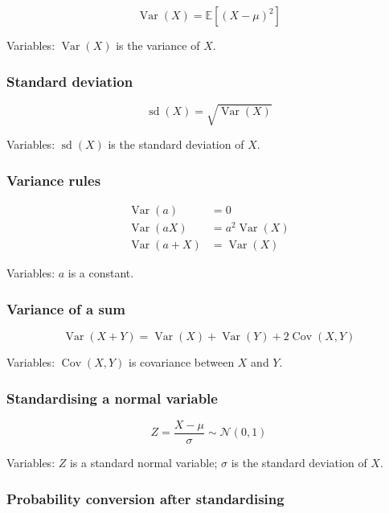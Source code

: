 \documentclass[
  8pt,
  twocolumn]{extarticle}
\begin{document}
\[
\operatorname{Var}(X)=\mathbb E[(X-\mu)^2]
\]

Variables: \(\operatorname{Var}(X)\) is the variance of \(X\).

\subsubsection{Standard deviation}\label{standard-deviation}

\[
\operatorname{sd}(X)=\sqrt{\operatorname{Var}(X)}
\]

Variables: \(\operatorname{sd}(X)\) is the standard deviation of \(X\).

\subsubsection{Variance rules}\label{variance-rules}

\[
\begin{aligned}
\operatorname{Var}(a)&=0\\
\operatorname{Var}(aX)&=a^2\operatorname{Var}(X)\\
\operatorname{Var}(a+X)&=\operatorname{Var}(X)
\end{aligned}
\]

Variables: \(a\) is a constant.

\subsubsection{Variance of a sum}\label{variance-of-a-sum}

\[
\operatorname{Var}(X+Y)=\operatorname{Var}(X)+\operatorname{Var}(Y)+2\operatorname{Cov}(X,Y)
\]

Variables: \(\operatorname{Cov}(X,Y)\) is covariance between \(X\) and
\(Y\).

\subsubsection{Standardising a normal
variable}\label{standardising-a-normal-variable}

\[
Z=\frac{X-\mu}{\sigma}\sim\mathcal N(0,1)
\]

Variables: \(Z\) is a standard normal variable; \(\sigma\) is the
standard deviation of \(X\).

\subsubsection{Probability conversion after
standardising}\label{probability-conversion-after-standardising}
\end{document}
